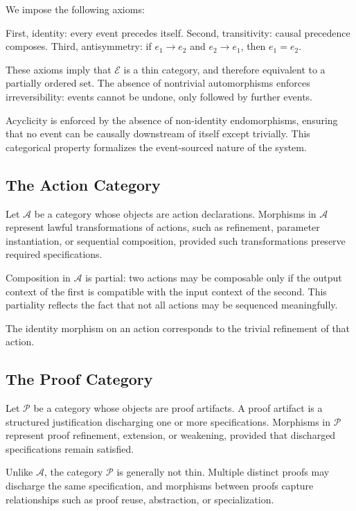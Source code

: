 \documentclass[11pt,oneside]{article}
\begin{document}
We impose the following axioms:

First, identity: every event precedes itself.  
Second, transitivity: causal precedence composes.  
Third, antisymmetry: if \( e_1 \to e_2 \) and \( e_2 \to e_1 \), then \( e_1 = e_2 \).

These axioms imply that \( \mathcal{E} \) is a thin category, and therefore equivalent to a partially ordered set. The absence of nontrivial automorphisms enforces irreversibility: events cannot be undone, only followed by further events.

Acyclicity is enforced by the absence of non-identity endomorphisms, ensuring that no event can be causally downstream of itself except trivially. This categorical property formalizes the event-sourced nature of the system.

\subsection{The Action Category}

Let \( \mathcal{A} \) be a category whose objects are action declarations. Morphisms in \( \mathcal{A} \) represent lawful transformations of actions, such as refinement, parameter instantiation, or sequential composition, provided such transformations preserve required specifications.

Composition in \( \mathcal{A} \) is partial: two actions may be composable only if the output context of the first is compatible with the input context of the second. This partiality reflects the fact that not all actions may be sequenced meaningfully.

The identity morphism on an action corresponds to the trivial refinement of that action.

\subsection{The Proof Category}

Let \( \mathcal{P} \) be a category whose objects are proof artifacts. A proof artifact is a structured justification discharging one or more specifications. Morphisms in \( \mathcal{P} \) represent proof refinement, extension, or weakening, provided that discharged specifications remain satisfied.

Unlike \( \mathcal{A} \), the category \( \mathcal{P} \) is generally not thin. Multiple distinct proofs may discharge the same specification, and morphisms between proofs capture relationships such as proof reuse, abstraction, or specialization.
\end{document}
